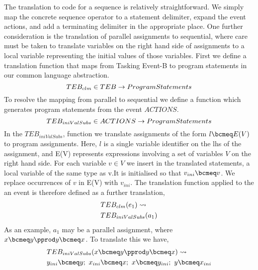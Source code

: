 The translation to code for a sequence is relatively straightforward. We simply map the concrete sequence operator to a statement delimiter, expand the event actions, and add a terminating delimiter in the appropriate place. One further consideration is the translation of parallel assignments to sequential, where care must be taken to translate variables on the right hand side of assignments to a local variable representing the initial values of those variables. First we define a translation function that maps from Tasking Event-B to program statements in our common language abstraction.   
\begin{equation}
TEB_{clm} \in  TEB \rightarrow ProgramStatements
\notag
\end{equation}
To resolve the mapping from parallel to sequential we define a function which generates program statements from the event $ACTIONS$. 
\begin{equation}
TEB_{iniValSubs} \in  ACTIONS \rightarrow ProgramStatements
\notag
\end{equation}
In the $TEB_{iniValSubs}$, function we translate assignments of the form $l \bcmeq E(V)$ to program assignments. Here, $l$ is a single variable identifier on the lhs of the assignment, and  E(V) represents expressions involving a set of variables $V$ on the right hand side. For each variable $v \in V$ we insert in the translated statements, a local variable of the same type as v.It is initialised so that $v_{ini} \bcmeq v$. We replace occurrences of $v$ in E(V) with $v_{ini}$. The translation function applied to the an event is therefore defined as a further translation,
%
\begin{equation}
\begin{split}
&TEB_{clm}(e_1) \leadsto \\
&TEB_{iniValSubs}(a_1)
\end{split}
\notag
\end{equation}
%
As an example, $a_1$ may be a parallel assignment, where $x \bcmeq y \pprod y \bcmeq x$. To translate this we have,
%
\begin{equation}
\begin{split}
&TEB_{iniValSubs}(x \bcmeq y \pprod y \bcmeq x) \leadsto\\
&y_{ini} \bcmeq y;~ x_{ini} \bcmeq x;~ x \bcmeq y_{ini};~ y \bcmeq x_{ini}  
\end{split}
\notag
\end{equation}
%  
